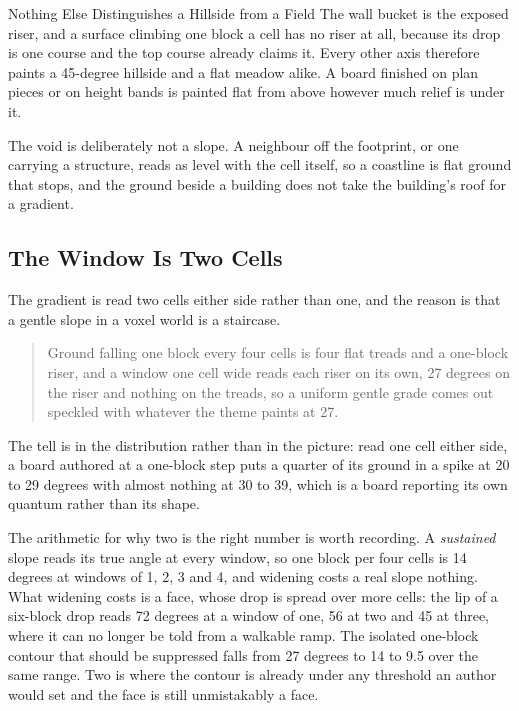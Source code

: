 \begin{ruling}{Nothing Else Distinguishes a Hillside from a Field}
The wall bucket is the exposed riser, and a surface climbing one block a cell has
no riser at all, because its drop is one course and the top course already claims
it. Every other axis therefore paints a 45-degree hillside and a flat meadow alike.
A board finished on plan pieces or on height bands is painted flat from above
however much relief is under it.
\end{ruling}

The void is deliberately not a slope. A neighbour off the footprint, or one
carrying a structure, reads as level with the cell itself, so a coastline is flat
ground that stops, and the ground beside a building does not take the building's
roof for a gradient.

\subsection{The Window Is Two Cells}

The gradient is read two cells either side rather than one, and the reason is that
a gentle slope in a voxel world is a staircase.

\begin{quote}
Ground falling one block every four cells is four flat treads and a one-block
riser, and a window one cell wide reads each riser on its own, 27 degrees on the
riser and nothing on the treads, so a uniform gentle grade comes out speckled with
whatever the theme paints at 27.
\end{quote}

The tell is in the distribution rather than in the picture: read one cell either
side, a board authored at a one-block step puts a quarter of its ground in a spike
at 20 to 29 degrees with almost nothing at 30 to 39, which is a board reporting its
own quantum rather than its shape.

The arithmetic for why two is the right number is worth recording. A
\emph{sustained} slope reads its true angle at every window, so one block per four
cells is 14 degrees at windows of 1, 2, 3 and 4, and widening costs a real slope
nothing. What widening costs is a face, whose drop is spread over more cells: the
lip of a six-block drop reads 72 degrees at a window of one, 56 at two and 45 at
three, where it can no longer be told from a walkable ramp. The isolated one-block
contour that should be suppressed falls from 27 degrees to 14 to 9.5 over the same
range. Two is where the contour is already under any threshold an author would set
and the face is still unmistakably a face.

